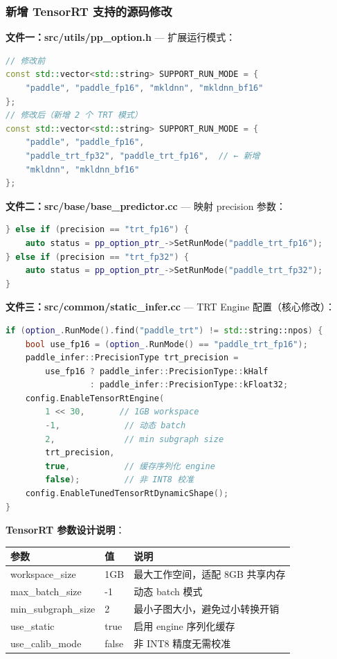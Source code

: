 \documentclass[12pt,a4paper]{ctexart}
\begin{document}
\subsubsection{新增 TensorRT 支持的源码修改}

\textbf{文件一：src/utils/pp\_option.h} — 扩展运行模式：
\begin{lstlisting}[language=C++]
// 修改前
const std::vector<std::string> SUPPORT_RUN_MODE = {
    "paddle", "paddle_fp16", "mkldnn", "mkldnn_bf16"
};
// 修改后（新增 2 个 TRT 模式）
const std::vector<std::string> SUPPORT_RUN_MODE = {
    "paddle", "paddle_fp16",
    "paddle_trt_fp32", "paddle_trt_fp16",  // ← 新增
    "mkldnn", "mkldnn_bf16"
};
\end{lstlisting}

\textbf{文件二：src/base/base\_predictor.cc} — 映射 precision 参数：
\begin{lstlisting}[language=C++]
} else if (precision == "trt_fp16") {
    auto status = pp_option_ptr_->SetRunMode("paddle_trt_fp16");
} else if (precision == "trt_fp32") {
    auto status = pp_option_ptr_->SetRunMode("paddle_trt_fp32");
}
\end{lstlisting}

\textbf{文件三：src/common/static\_infer.cc} — TRT Engine 配置（核心修改）：
\begin{lstlisting}[language=C++]
if (option_.RunMode().find("paddle_trt") != std::string::npos) {
    bool use_fp16 = (option_.RunMode() == "paddle_trt_fp16");
    paddle_infer::PrecisionType trt_precision =
        use_fp16 ? paddle_infer::PrecisionType::kHalf
                 : paddle_infer::PrecisionType::kFloat32;
    config.EnableTensorRtEngine(
        1 << 30,       // 1GB workspace
        -1,             // 动态 batch
        2,              // min subgraph size
        trt_precision,
        true,           // 缓存序列化 engine
        false);         // 非 INT8 校准
    config.EnableTunedTensorRtDynamicShape();
}
\end{lstlisting}

\textbf{TensorRT 参数设计说明}：
\begin{longtable}{|p{3.5cm}|p{2cm}|p{7.5cm}|}\hline
\textbf{参数} & \textbf{值} & \textbf{说明} \\\hline
workspace\_size & 1GB & 最大工作空间，适配 8GB 共享内存 \\\hline
max\_batch\_size & -1 & 动态 batch 模式 \\\hline
min\_subgraph\_size & 2 & 最小子图大小，避免过小转换开销 \\\hline
use\_static & true & 启用 engine 序列化缓存 \\\hline
use\_calib\_mode & false & 非 INT8 精度无需校准 \\\hline
\end{longtable}
\end{document}
